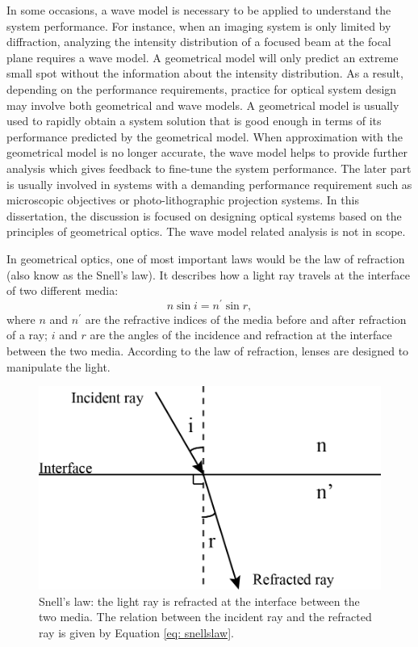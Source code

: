  
In some occasions, a wave model is necessary to be applied to understand the system performance. For instance, when an imaging system is only limited by diffraction, analyzing the intensity distribution of a focused beam at the focal plane requires a wave model. A geometrical model will only predict an extreme small spot without the information about the intensity distribution. As a result, depending on the performance requirements, practice for optical system design may involve both geometrical and wave models. A geometrical model is usually used to rapidly obtain a system solution that is good enough in terms of its performance predicted by the geometrical model. When approximation with the geometrical model is no longer accurate, the wave model helps to provide further analysis which gives feedback to fine-tune the system performance. The later part is usually involved in systems with a demanding performance requirement such as microscopic objectives or photo-lithographic projection systems. In this dissertation, the discussion is focused on designing optical systems based on the principles of geometrical optics. The wave model related analysis is not in scope.  


In geometrical optics, one of most important laws would be the law of refraction (also know as the Snell's law). It describes how a light ray travels at the interface of two different media:
\begin{equation}
n \sin i = n^\prime \sin r,
\label{eq: snellslaw}
\end{equation}
where $n$ and $n^\prime$ are the refractive indices of the media before and after refraction of a ray; $i$ and $r$ are the angles of the incidence and refraction at the interface between the two media. According to the law of refraction, lenses are designed to manipulate the light.
\begin{figure}
    \centering
    \includegraphics[scale=0.65]{chapter-1/figures/snellslaw.png}
    \caption{Snell's law: the light ray is refracted at the interface between the two media. The relation between the incident ray and the refracted ray is given by Equation \ref{eq: snellslaw}.}
    \label{fig: snellslaw}
\end{figure} 

